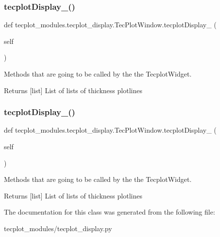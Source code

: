 \subsubsection{\texorpdfstring{tecplot\+Display\+\_()}{tecplotDisplay\_3()}}
{\footnotesize\ttfamily def tecplot\+\_\+modules.\+tecplot\+\_\+display.\+Tec\+Plot\+Window.\+tecplot\+Display\+\_ (\begin{DoxyParamCaption}\item[{}]{self }\end{DoxyParamCaption})}



Methods that are going to be called by the the Tecplot\+Widget. 

\begin{DoxyReturn}{Returns}
\mbox{[}list\mbox{]} List of lists of thickness plotlines 
\end{DoxyReturn}
\hypertarget{a00117_acdc9dc387494507084a2ab2cc0c8d9ac}{}\label{a00117_acdc9dc387494507084a2ab2cc0c8d9ac} 
\subsubsection{\texorpdfstring{tecplot\+Display\+\_()}{tecplotDisplay\_4()}}
{\footnotesize\ttfamily def tecplot\+\_\+modules.\+tecplot\+\_\+display.\+Tec\+Plot\+Window.\+tecplot\+Display\+\_ (\begin{DoxyParamCaption}\item[{}]{self }\end{DoxyParamCaption})}



Methods that are going to be called by the the Tecplot\+Widget. 

\begin{DoxyReturn}{Returns}
\mbox{[}list\mbox{]} List of lists of thickness plotlines 
\end{DoxyReturn}


The documentation for this class was generated from the following file\+:\begin{DoxyCompactItemize}
\item 
tecplot\+\_\+modules/tecplot\+\_\+display.\+py\end{DoxyCompactItemize}
